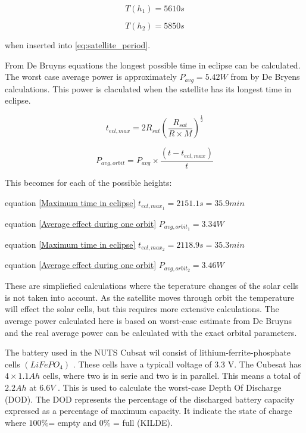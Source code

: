 \begin{equation}
T(h_1) = 5610s
\end{equation}

\begin{equation}
T(h_2) = 5850s
\end{equation}

when inserted into \autoref{eq:satellite_period}.

From De Bruyns equations \cite{Satellite Power Systems} the longest possible time in eclipse can be calculated. The worst case average power is approximately $P_{avg} = 5.42 W$ from by De Bryens calculations. This power is claculated when the satellite has its longest time in eclipse.

\begin{equation}
	t_{ecl,max} = 2R_{sat}\left(\frac{R_{sat}}{R\times M}\right)^{\frac{1}{2}}
	\label{Maximum time in eclipse}
\end{equation}

\begin{equation}
	P_{avg,orbit} = P_{avg}\times\frac{(t-t_{ecl,max})}{t}
	\label{Average effect during one orbit}
\end{equation}

This becomes for each of the possible heights:

equation \ref{Maximum time in eclipse}
$t_{ecl,max_1} = 2151.1 s = 35.9 min$

equation \ref{Average effect during one orbit}
$P_{avg,orbit_1} = 3.34W$

equation \ref{Maximum time in eclipse}
$t_{ecl,max_2} = 2118.9 s = 35.3 min$

equation \ref{Average effect during one orbit}
$P_{avg,orbit_2} = 3.46W$

\vspace{5 mm}These are simpliefied calculations where the teperature changes of the solar cells is not taken into account. As the satellite moves through orbit the temperature will effect the solar cells, but this requires more extensive calculations. The average power calculated here is based on worst-case estimate from De Bruyns \cite{Satellite Power Systems} and the real average power can be calculated with the exact orbital parameters. 

The battery used in the NUTS Cubsat wil consist of lithium-ferrite-phosphate cells $(LiFePO_4)$ \cite{Overview of NUTS}. 
These cells have a typicall voltage of 3.3 V. The Cubesat has $4\times 1.1 Ah$ cells, where two is in serie and two is in parallel. This means a total of $2.2Ah$ at $6.6V$ \cite{Satellite Power Systems}. This is used to calculate the worst-case Depth Of Discharge (DOD). The DOD represents the percentage of the discharged battery capacity expressed as a percentage of maximum capacity. It indicate the state of charge where $100\% $= empty and  $0\%$ = full (KILDE).

